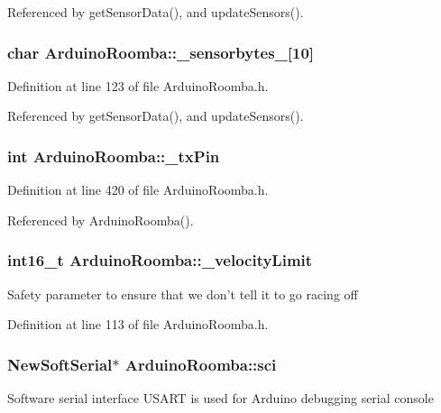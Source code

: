 Referenced by getSensorData(), and updateSensors().

\hypertarget{class_arduino_roomba_a6942cabb372dfd593602d6c4762d88ec}{
\subsubsection[{\_\-sensorbytes\_\-3}]{\setlength{\rightskip}{0pt plus 5cm}char {\bf ArduinoRoomba::\_\-sensorbytes\_}\mbox{[}10\mbox{]}}}
\label{class_arduino_roomba_a6942cabb372dfd593602d6c4762d88ec}


Definition at line 123 of file ArduinoRoomba.h.



Referenced by getSensorData(), and updateSensors().

\hypertarget{class_arduino_roomba_af764f98573d1b77e200811c2d76eef3a}{
\subsubsection[{\_\-txPin}]{\setlength{\rightskip}{0pt plus 5cm}int {\bf ArduinoRoomba::\_\-txPin}}}
\label{class_arduino_roomba_af764f98573d1b77e200811c2d76eef3a}


Definition at line 420 of file ArduinoRoomba.h.



Referenced by ArduinoRoomba().

\hypertarget{class_arduino_roomba_af5babb87f8490752103ab4ce22a5a0f5}{
\subsubsection[{\_\-velocityLimit}]{\setlength{\rightskip}{0pt plus 5cm}int16\_\-t {\bf ArduinoRoomba::\_\-velocityLimit}}}
\label{class_arduino_roomba_af5babb87f8490752103ab4ce22a5a0f5}
Safety parameter to ensure that we don't tell it to go racing off 

Definition at line 113 of file ArduinoRoomba.h.

\hypertarget{class_arduino_roomba_ae645170022a5949dcc5ecd4183e50c2a}{
\subsubsection[{sci}]{\setlength{\rightskip}{0pt plus 5cm}NewSoftSerial$\ast$ {\bf ArduinoRoomba::sci}}}
\label{class_arduino_roomba_ae645170022a5949dcc5ecd4183e50c2a}
Software serial interface USART is used for Arduino debugging serial console 

